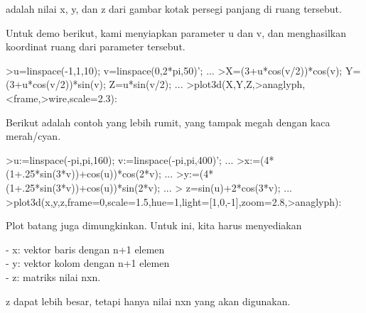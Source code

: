 \documentclass[a4paper,10pt]{article}
\begin{document}
\begin{eulernotebook}
\begin{eulercomment}
\begin{eulercomment}
\begin{eulercomment}
\begin{eulercomment}
\begin{eulercomment}
\begin{eulercomment}
\begin{eulercomment}
\begin{eulercomment}
\begin{eulercomment}
\begin{eulercomment}
\begin{eulercomment}
\begin{eulercomment}
\begin{eulercomment}
\begin{eulercomment}
\begin{eulercomment}
\begin{eulercomment}
\begin{eulercomment}
adalah nilai x, y, dan z dari gambar kotak persegi panjang di ruang
tersebut.

Untuk demo berikut, kami menyiapkan parameter u dan v, dan
menghasilkan koordinat ruang dari parameter tersebut.
\end{eulercomment}
\begin{eulerprompt}
>u=linspace(-1,1,10); v=linspace(0,2*pi,50)'; ...
>X=(3+u*cos(v/2))*cos(v); Y=(3+u*cos(v/2))*sin(v); Z=u*sin(v/2); ...
>plot3d(X,Y,Z,>anaglyph,<frame,>wire,scale=2.3):
\end{eulerprompt}
\begin{eulercomment}
Berikut adalah contoh yang lebih rumit, yang tampak megah dengan kaca
merah/cyan.
\end{eulercomment}
\begin{eulerprompt}
>u:=linspace(-pi,pi,160); v:=linspace(-pi,pi,400)';  ...
>x:=(4*(1+.25*sin(3*v))+cos(u))*cos(2*v); ...
>y:=(4*(1+.25*sin(3*v))+cos(u))*sin(2*v); ...
> z=sin(u)+2*cos(3*v); ...
>plot3d(x,y,z,frame=0,scale=1.5,hue=1,light=[1,0,-1],zoom=2.8,>anaglyph):
\end{eulerprompt}
\begin{eulercomment}
Plot batang juga dimungkinkan. Untuk ini, kita harus menyediakan

- x: vektor baris dengan n+1 elemen\\
- y: vektor kolom dengan n+1 elemen\\
- z: matriks nilai nxn.

z dapat lebih besar, tetapi hanya nilai nxn yang akan digunakan.


\end{eulercomment}
\end{eulercomment}
\end{eulercomment}
\end{eulercomment}
\end{eulercomment}
\end{eulercomment}
\end{eulercomment}
\end{eulercomment}
\end{eulercomment}
\end{eulercomment}
\end{eulercomment}
\end{eulercomment}
\end{eulercomment}
\end{eulercomment}
\end{eulercomment}
\end{eulercomment}
\end{eulercomment}
\end{eulernotebook}
\end{document}
